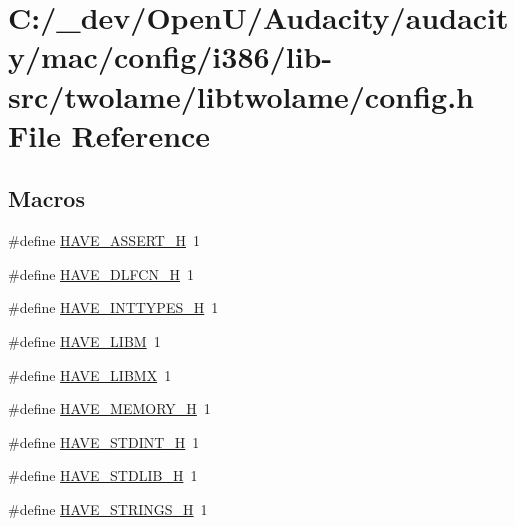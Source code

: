 \hypertarget{mac_2config_2i386_2lib-src_2twolame_2libtwolame_2config_8h}{}\section{C\+:/\+\_\+dev/\+Open\+U/\+Audacity/audacity/mac/config/i386/lib-\/src/twolame/libtwolame/config.h File Reference}
\label{mac_2config_2i386_2lib-src_2twolame_2libtwolame_2config_8h}
\subsection*{Macros}
\begin{DoxyCompactItemize}
\item 
\#define \hyperlink{mac_2config_2i386_2lib-src_2twolame_2libtwolame_2config_8h_ad0eabe2e5407bc73450eb15b657983cd}{H\+A\+V\+E\+\_\+\+A\+S\+S\+E\+R\+T\+\_\+H}~1
\item 
\#define \hyperlink{mac_2config_2i386_2lib-src_2twolame_2libtwolame_2config_8h_a0ee1617ff2f6885ef384a3dd46f9b9d7}{H\+A\+V\+E\+\_\+\+D\+L\+F\+C\+N\+\_\+H}~1
\item 
\#define \hyperlink{mac_2config_2i386_2lib-src_2twolame_2libtwolame_2config_8h_ab90a030ff2790ebdc176660a6dd2a478}{H\+A\+V\+E\+\_\+\+I\+N\+T\+T\+Y\+P\+E\+S\+\_\+H}~1
\item 
\#define \hyperlink{mac_2config_2i386_2lib-src_2twolame_2libtwolame_2config_8h_a822fccccd955b712f62f5ade934e86fc}{H\+A\+V\+E\+\_\+\+L\+I\+BM}~1
\item 
\#define \hyperlink{mac_2config_2i386_2lib-src_2twolame_2libtwolame_2config_8h_acc600a794ecc7ec0872daf10f6eb43b6}{H\+A\+V\+E\+\_\+\+L\+I\+B\+MX}~1
\item 
\#define \hyperlink{mac_2config_2i386_2lib-src_2twolame_2libtwolame_2config_8h_ae93a78f9d076138897af441c9f86f285}{H\+A\+V\+E\+\_\+\+M\+E\+M\+O\+R\+Y\+\_\+H}~1
\item 
\#define \hyperlink{mac_2config_2i386_2lib-src_2twolame_2libtwolame_2config_8h_ab6cd6d1c63c1e26ea2d4537b77148354}{H\+A\+V\+E\+\_\+\+S\+T\+D\+I\+N\+T\+\_\+H}~1
\item 
\#define \hyperlink{mac_2config_2i386_2lib-src_2twolame_2libtwolame_2config_8h_a9e0e434ec1a6ddbd97db12b5a32905e0}{H\+A\+V\+E\+\_\+\+S\+T\+D\+L\+I\+B\+\_\+H}~1
\item 
\#define \hyperlink{mac_2config_2i386_2lib-src_2twolame_2libtwolame_2config_8h_a405d10d46190bcb0320524c54eafc850}{H\+A\+V\+E\+\_\+\+S\+T\+R\+I\+N\+G\+S\+\_\+H}~1

\end{DoxyCompactItemize}
